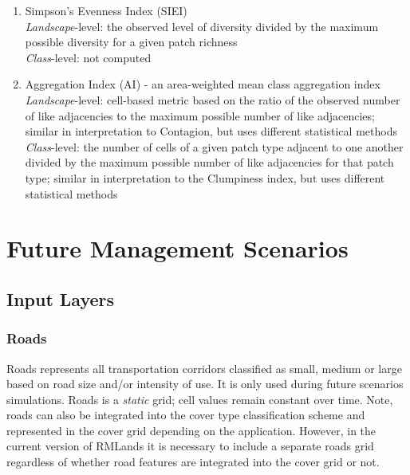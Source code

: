 \begin{itemize}
\begin{enumerate}
		\item Simpson's Evenness Index (SIEI) \\
		\emph{Landscape}-level:  the observed level of diversity divided by the maximum possible diversity for a given patch richness 	\\
		\emph{Class}-level: not computed\\
		
		\item Aggregation Index (AI) - an area-weighted mean class aggregation index \\
		\emph{Landscape}-level: cell-based metric based on the ratio of the observed number of like adjacencies to the maximum possible number of like adjacencies; similar in interpretation to Contagion, but uses different statistical methods
		\emph{Class}-level: the number of cells of a given patch type adjacent to one another divided by the maximum possible number of like adjacencies for that patch type; similar in interpretation to the Clumpiness index, but uses different statistical methods	\\
	\end{enumerate}

\end{itemize}

\section{Future Management Scenarios}

\subsection{Input Layers}

\subsubsection{Roads} 
Roads represents all transportation corridors classified as small, medium or large based on road size and/or intensity of use. It is only used during future scenarios simulations. Roads is a \emph{static} grid; cell values remain constant over time. Note, roads can also be integrated into the cover type classification scheme and represented in the cover grid depending on the application. However, in the current version of RMLands it is necessary to include a separate roads grid regardless of whether road features are integrated into the cover grid or not.

